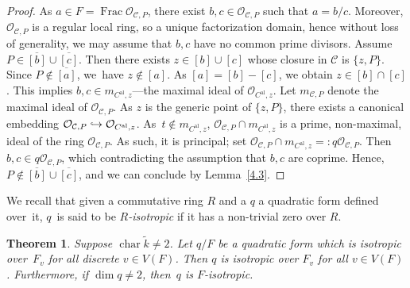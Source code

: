 \documentclass[JEP,XML,SOM,Unicode,NoFloatCountersInSection,published]{cedram}
\newcommand{\hto}{\mathrel{\lhook\joinrel\to}}
\newcommand{\al}{\mathrm{al}}
\DeclareMathOperator{\Char}{char}
\DeclareMathOperator{\Frac}{Frac}
\newtheorem{thm}{Theorem}[section]
\theoremstyle{definition}
\begin{document}
\begin{proof}
As $a \in F=\Frac \mathcal{O}_{\mathcal{C}, P}$, there exist $b, c \in \mathcal{O}_{\mathcal{C}, P}$ such that $a=b/c$. Moreover, $\mathcal{O}_{\mathcal{C}, P}$ is a regular local ring, so a unique factorization domain, hence without loss of generality, we may assume that $b,c$ have no common prime divisors. Assume \hbox{$P \in \overline{[b]} \cup \overline{[c]}$}. Then there exists $z \in [b] \cup [c]$ whose closure in $\mathcal{C}$ is $\{z, P\}$. Since $P \not \in \overline{[a]}$, we~have $z \not \in [a]$. As $[a]=[b]-[c]$, we obtain $z \in [b] \cap [c]$. This implies $b, c \in m_{C^{\al},z}$---the maximal ideal of $\mathcal{O}_{C^{\al},z}$. Let $m_{\mathcal{C},P}$ denote the maximal ideal of $\mathcal{O}_{\mathcal{C}, P}$. As $z$ is the generic point of $\{z, P\}$, there exists a canonical embedding $\mathcal{O}_{\mathcal{C}, P} \hto \mathcal{O}_{C^{\al},z}$. As~$t \not \in m_{C^{\al},z}$, $\mathcal{O}_{\mathcal{C}, P} \cap m_{C^{\al},z}$ is a prime, non-maximal, ideal of the ring $\mathcal{O}_{\mathcal{C}, P}$. As such, it is principal; set $\mathcal{O}_{\mathcal{C}, P} \cap m_{C^{\al},z} =:q \mathcal{O}_{\mathcal{C}, P}$. Then $b,c \in q \mathcal{O}_{\mathcal{C}, P}$, which contradicting the assumption that $b,c$ are coprime.
Hence, $P \not \in \overline{[b]} \cup \overline{[c]}$, and we can conclude by Lemma~\ref{4.3}.
\end{proof}

We recall that given a commutative ring $R$ and a $q$ a quadratic form defined over~it, $q$~is said to be \emph{$R$-isotropic} if it has a non-trivial zero over $R$.

\begin{thm} \label{4.5}
Suppose $\Char \widetilde{k} \neq 2$. Let $q/F$ be a quadratic form which is isotropic over~$F_v$ for all \emph{discrete} $v \in V(F)$. Then $q$ is isotropic over $F_v$ for \emph{all} $v \in V(F)$. Furthermore, if $\dim{q} \neq 2$, then~$q$ is $F$-isotropic.
\end{thm}
\end{document}
